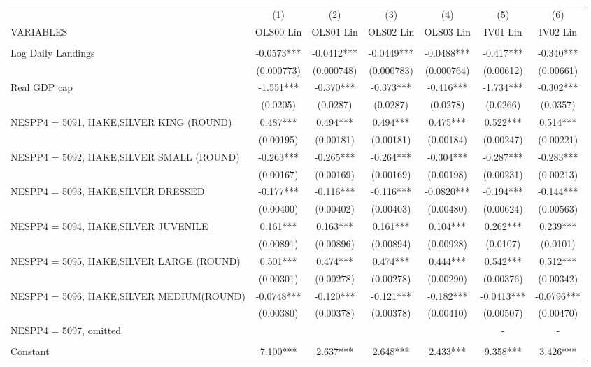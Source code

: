\begin{tabular}{lcccccc} \hline
 & (1) & (2) & (3) & (4) & (5) & (6) \\
VARIABLES & OLS00 Lin & OLS01 Lin & OLS02 Lin & OLS03 Lin & IV01 Lin & IV02 Lin \\ \hline
 &  &  &  &  &  &  \\
Log Daily Landings & -0.0573*** & -0.0412*** & -0.0449*** & -0.0488*** & -0.417*** & -0.340*** \\
 & (0.000773) & (0.000748) & (0.000783) & (0.000764) & (0.00612) & (0.00661) \\
Real GDP cap & -1.551*** & -0.370*** & -0.373*** & -0.416*** & -1.734*** & -0.302*** \\
 & (0.0205) & (0.0287) & (0.0287) & (0.0278) & (0.0266) & (0.0357) \\
NESPP4 = 5091, HAKE,SILVER KING (ROUND) & 0.487*** & 0.494*** & 0.494*** & 0.475*** & 0.522*** & 0.514*** \\
 & (0.00195) & (0.00181) & (0.00181) & (0.00184) & (0.00247) & (0.00221) \\
NESPP4 = 5092, HAKE,SILVER SMALL (ROUND) & -0.263*** & -0.265*** & -0.264*** & -0.304*** & -0.287*** & -0.283*** \\
 & (0.00167) & (0.00169) & (0.00169) & (0.00198) & (0.00231) & (0.00213) \\
NESPP4 = 5093, HAKE,SILVER DRESSED & -0.177*** & -0.116*** & -0.116*** & -0.0820*** & -0.194*** & -0.144*** \\
 & (0.00400) & (0.00402) & (0.00403) & (0.00480) & (0.00624) & (0.00563) \\
NESPP4 = 5094, HAKE,SILVER JUVENILE & 0.161*** & 0.163*** & 0.161*** & 0.104*** & 0.262*** & 0.239*** \\
 & (0.00891) & (0.00896) & (0.00894) & (0.00928) & (0.0107) & (0.0101) \\
NESPP4 = 5095, HAKE,SILVER LARGE (ROUND) & 0.501*** & 0.474*** & 0.474*** & 0.444*** & 0.542*** & 0.512*** \\
 & (0.00301) & (0.00278) & (0.00278) & (0.00290) & (0.00376) & (0.00342) \\
NESPP4 = 5096, HAKE,SILVER MEDIUM(ROUND) & -0.0748*** & -0.120*** & -0.121*** & -0.182*** & -0.0413*** & -0.0796*** \\
 & (0.00380) & (0.00378) & (0.00378) & (0.00410) & (0.00507) & (0.00470) \\
NESPP4 = 5097, omitted &  &  &  &  & - & - \\
 &  &  &  &  &  &  \\
Constant & 7.100*** & 2.637*** & 2.648*** & 2.433*** & 9.358*** & 3.426*** \\

\end{tabular}
